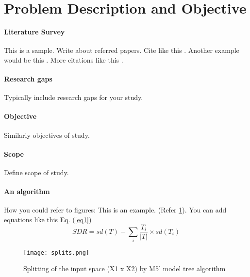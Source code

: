 \section{Problem Description and Objective}



\paragraph{Literature Survey}

This is a sample. Write about referred papers. Cite like this \cite{c7}. Another example would be this \cite{c1}. More citations like this \cite{c3}.

\paragraph{Research gaps}
Typically include research gaps for your study. 
\paragraph{Objective}
Similarly objectives of study. 
\paragraph{Scope}
Define scope of study. 
\paragraph{An algorithm}
How you could refer to figures: This is an example. (Refer \ref{fig5}). You can add equations like this Eq. (\ref{eq1})
\begin{equation}
\label{eq1}
  SDR = sd(T) - \sum_{i}\frac{{T}_{i}}{|T|}\times sd({T}_{i})
\end{equation}

\begin{figure}[]
\centering
\texttt{[image: splits.png]}
\caption{Splitting of the input space (X1 x X2) by M5' model tree algorithm}
\label{fig5}
\end{figure}

